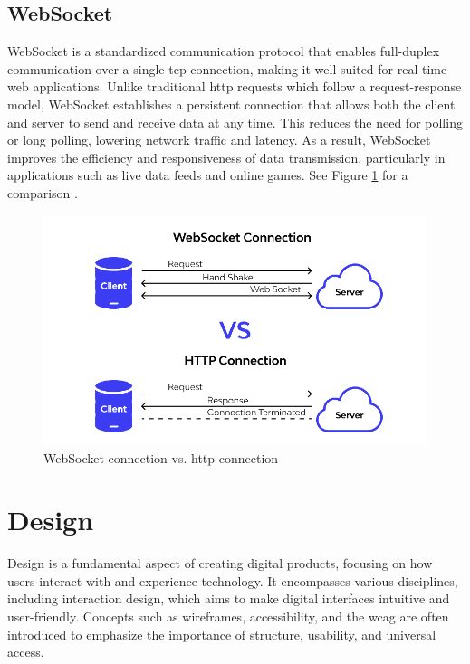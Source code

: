 \subsection*{WebSocket}
\label{subsec:websocket}

WebSocket is a standardized communication protocol that enables full-duplex communication over a single \gls{tcp} connection, making it well-suited for real-time web applications. Unlike traditional \gls{http} requests which follow a request-response model, WebSocket establishes a persistent connection that allows both the client and server to send and receive data at any time. This reduces the need for polling or long polling, lowering network traffic and latency. As a result, WebSocket improves the efficiency and responsiveness of data transmission, particularly in applications such as live data feeds and online games. See Figure \ref{fig:websocket-vs-http} for a comparison \cite{nodejs:websocket, apidog:websocket}.

\newpage

\begin{figure}[h!]
    \centering
    \includegraphics[width=0.70\linewidth]{figures/theory/websocket-vs-http.png}
    \caption[WebSocket connection vs. HTTP connection]{WebSocket connection vs. \gls{http} connection \cite{apidog:websocket}}
    \label{fig:websocket-vs-http}
\end{figure}

\section{Design}
\label{sec:design}

Design is a fundamental aspect of creating digital products, focusing on how users interact with and experience technology. It encompasses various disciplines, including interaction design, which aims to make digital interfaces intuitive and user-friendly. Concepts such as wireframes, accessibility, and the \gls{wcag} are often introduced to emphasize the importance of structure, usability, and universal access. \\

